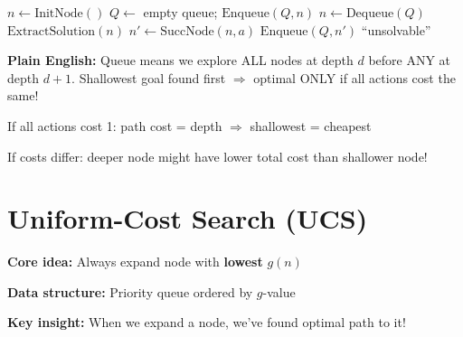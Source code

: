 \documentclass[11pt,a4paper]{article}
\begin{document}
\begin{examplebox}
\begin{algorithmic}
\STATE $n \gets \text{InitNode}()$ 
\STATE $Q \gets$ empty queue; $\text{Enqueue}(Q, n)$ 
    \STATE $n \gets \text{Dequeue}(Q)$ 
        \RETURN $\text{ExtractSolution}(n)$ 
    \ENDIF
     
        \STATE $n' \gets \text{SuccNode}(n, a)$ 
        \STATE $\text{Enqueue}(Q, n')$ 
    \ENDFOR
\ENDWHILE
\RETURN ``unsolvable'' 
\end{algorithmic}
\textbf{Plain English:} Queue means we explore ALL nodes at depth $d$ before ANY at depth $d{+}1$. Shallowest goal found first $\Rightarrow$ optimal ONLY if all actions cost the same!
\end{examplebox}

\begin{notebox}
If all actions cost 1: path cost = depth $\Rightarrow$ shallowest = cheapest

If costs differ: deeper node might have lower total cost than shallower node!
\end{notebox}

\section{Uniform-Cost Search (UCS)}

\begin{definitionbox}
\textbf{Core idea:} Always expand node with \textbf{lowest} $g(n)$

\textbf{Data structure:} Priority queue ordered by $g$-value

\textbf{Key insight:} When we expand a node, we've found optimal path to it!
\end{definitionbox}
\end{document}
